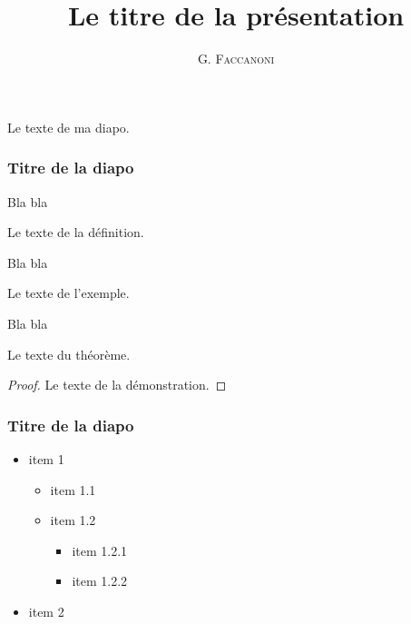 \documentclass[hyperref={pdfpagemode=FullScreen,colorlinks=false}]{beamer}
\title{Le titre de la présentation}
\author{G. \textsc{Faccanoni}}
\institute{IMATH-UTLN}
\begin{document}
\begin{frame}[plain]
\maketitle
\end{frame}
\begin{frame}
Le texte de ma diapo.
\end{frame}
\begin{frame}
\frametitle{Titre de la diapo}
Bla bla
\begin{definition}
Le texte de la définition.
\end{definition}
Bla bla
\begin{example}
Le texte de l'exemple.
\end{example}
Bla bla
\begin{theorem}
Le texte du théorème.
\end{theorem}
\begin{proof}
Le texte de la démonstration.
\end{proof}
\end{frame}

\begin{frame}
\frametitle{Titre de la diapo}
\begin{itemize}
\item item 1
\begin{itemize}
\item item 1.1
\item item 1.2
\begin{itemize}
\item item 1.2.1
\item item 1.2.2
\end{itemize}
\end{itemize}
\item item 2
\end{itemize}
\end{frame}
\end{document}
